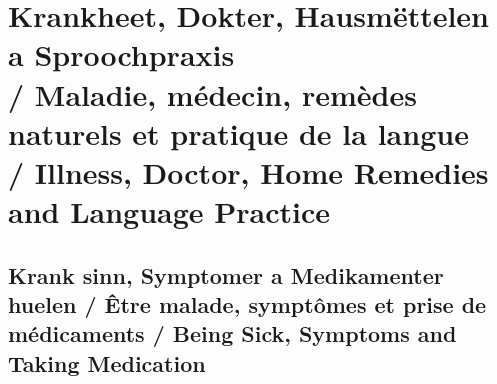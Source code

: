 \vspace{1.5em}

\section[Krankheet, Dokter, Hausmëttelen a Sproochpraxis / Illness, Remedies and Practice]{Krankheet, Dokter, Hausmëttelen a Sproochpraxis \\/ Maladie, médecin, remèdes naturels et pratique de la langue \\/ Illness, Doctor, Home Remedies and Language Practice}

\subsection{Krank sinn, Symptomer a Medikamenter huelen / Être malade, symptômes et prise de médicaments / Being Sick, Symptoms and Taking Medication}

